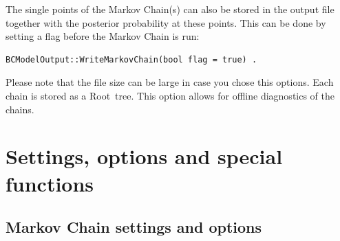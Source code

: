 \documentclass[11pt, a4paper]{article}
\newcommand{\Root}{{\sc Root}}
\begin{document}
The single points of the Markov Chain(s) can also be stored in the
output file together with the posterior probability at these
points. This can be done by setting a flag before the Markov Chain is
run:
%
\begin{verbatim}
BCModelOutput::WriteMarkovChain(bool flag = true) . 
\end{verbatim}
%
Please note that the file size can be large in case you chose this
options. Each chain is stored as a \Root\ tree. This option allows for
offline diagnostics of the chains. 


\section{Settings, options and special functions}
\label{section:settings}


\subsection{Markov Chain settings and options}
\label{section:settings:MCMC} 
\end{document}

